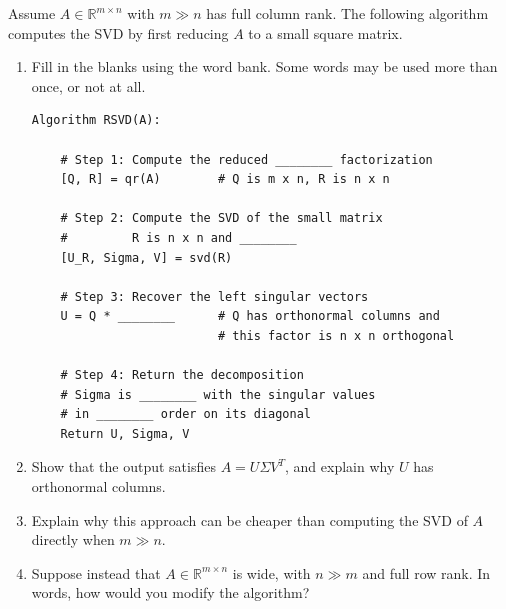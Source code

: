 \documentclass{ximera}
\begin{document}
\begin{exercise}

Assume $A \in \mathbb{R}^{m\times n}$ with $m \gg n$ has full column rank.
The following algorithm computes the SVD by first reducing $A$ to a small
square matrix.

\begin{enumerate}
    \item Fill in the blanks using the word bank. Some words may be used
    more than once, or not at all.

\begin{center}
\end{center}

\begin{lstlisting}
Algorithm RSVD(A):

    # Step 1: Compute the reduced ________ factorization
    [Q, R] = qr(A)        # Q is m x n, R is n x n

    # Step 2: Compute the SVD of the small matrix
    #         R is n x n and ________
    [U_R, Sigma, V] = svd(R)

    # Step 3: Recover the left singular vectors
    U = Q * ________      # Q has orthonormal columns and
                          # this factor is n x n orthogonal

    # Step 4: Return the decomposition
    # Sigma is ________ with the singular values
    # in ________ order on its diagonal
    Return U, Sigma, V
\end{lstlisting}

\item Show that the output satisfies $A = U\Sigma V^T$, and explain why
$U$ has orthonormal columns.

\item Explain why this approach can be cheaper than computing the SVD of
$A$ directly when $m \gg n$.

\item Suppose instead that $A \in \mathbb{R}^{m\times n}$ is wide, with
$n \gg m$ and full row rank. In words, how would you modify the
algorithm?

\end{enumerate}


\end{exercise}
\end{document}
